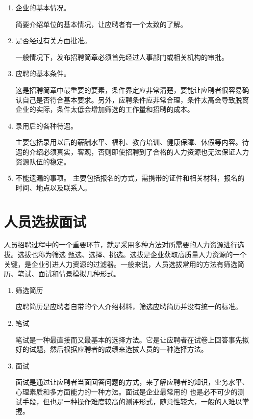     \begin{enumerate}
        \item 企业的基本情况。

        简要介绍单位的基本情况，让应聘者有一个太致的了解。

        \item 是否经过有关方面批准。

        一般情况下，发布招聘简章必须首先经过人事部门或相关机构的审批。

        \item 应聘的基本条件。

        这是招聘简章中最重要的要素，条件界定应非常清楚，要能让应聘者很容易确认自己是否符合基本要求。另外，应聘条件应非常合理，条件太高会导致脱离企业的实际，条件太低会增加筛选的工作量和招聘的成本。

        \item 录用后的各种待遇。

        主要包括录用以后的薪酬水平、福利、教育培训、健康保障、休假等内容。待遇的介绍必须真实，客观，否则即使招聘到了合格的人力资源也无法保证人力资源队伍的稳定。

        \item 不能遗漏的事项。
        主要包括报名的方式，需携带的证件和相关材科，报名的时间、地点以及联系人。
    \end{enumerate}

\section {人员选拔面试}

    人员招聘过程中的一个重要环节，就是采用多种方法对所需要的人力资源进行选拔。选拔也称为筛选 甄选、选择、挑选。选拔是企业获取高质量人力资源的一个关键，是企业引进人力资源的过滤器。一般来说，人员选拔常用的方法有筛选简历、笔试、面试和情景模拟几种形式。

    \begin{enumerate}
        \item 筛选简历

        应聘简历是应聘者自带的个人介绍材料，筛选应聘简历并没有统一的标准。

        \item  笔试

        笔试是一种最直接而又最基本的选择方法。它是让应聘者在试卷上回答事先拟好的试题，然后根据应聘者的成绩来选拔人员的一种选择方法。

        \item  面试

        面试是通过让应聘者当面回答问题的方式，来了解应聘者的知识，业务水平、心理素质和多方面能力的一种方法。面试是企业最常用的 也是必不可少的测试手段，但也是一种操作难度较高的测评形式，随意性较大，一般的人难以掌握。
    \end{enumerate}

